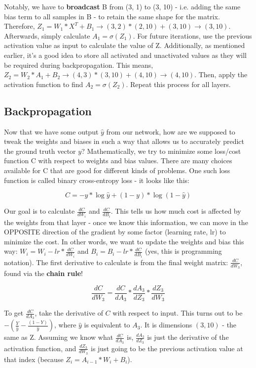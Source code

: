 \documentclass[12pt]{article}
\begin{document}
Notably, we have to \textbf{broadcast} B from (3, 1) to (3, 10) - i.e. adding the same bias term to all samples in B - to retain the same shape for the matrix. Therefore, $Z_1 = W_1 * X^T + B_1 \rightarrow (3, 2) * (2, 10) + (3, 10) \rightarrow (3, 10)$. Afterwards, simply calculate $A_1 = \sigma(Z_1)$. For future iterations, use the previous activation value as input to calculate the value of Z. Additionally, as mentioned earlier, it's a good idea to store all activated and unactivated values as they will be required during backpropagation. This means, $Z_2 = W_2 * A_1 + B_2 \rightarrow (4, 3) * (3, 10) + (4, 10) \rightarrow (4, 10)$. Then, apply the activation function to find $A_2 = \sigma(Z_2)$. Repeat this process for all layers. 

\subsection{Backpropagation}
Now that we have some output $\hat{y}$ from our network, how are we supposed to tweak the weights and biases in such a way that allows us to accurately predict the ground truth vector $y$? Mathematically, we try to minimize some loss/cost function C with respect to weights and bias values. There are many choices available for C that are good for different kinds of problems. One such loss function is called binary cross-entropy loss - it looks like this:

\[ C = -y * \log{\hat{y}} + (1-y) * \log{(1-\hat{y})} \]

Our goal is to calculate $\frac{dC}{dW_i}$ and $\frac{dC}{dB_i}$. This tells us how much cost is affected by the weights from that layer - once we know this information, we can move in the OPPOSITE direction of the gradient by some factor (learning rate, lr) to minimize the cost. In other words, we want to update the weights and bias this way: $W_i = W_i - lr * \frac{dC}{dW_i}$ and $B_i = B_i - lr * \frac{dC}{dB_i}$ (yes, this is programming notation). The first derivative to calculate is from the final weight matrix: $\frac{dC}{dW_3}$, found via the \textbf{chain rule}!

$$\frac{dC}{dW_3} = \frac{dC}{dA_3} * \frac{dA_3}{dZ_3} * \frac{dZ_3}{dW_3}$$ 

To get $\frac{dC}{dA_3}$, take the derivative of $C$ with respect to input. This turns out to be $-(\frac{Y}{\hat{y}} - \frac{(1-Y)}{\hat{y}})$, where $\hat{y}$ is equivalent to $A_3$. It is dimensions $(3, 10)$ - the same as Z. Assuming we know what $\frac{dC}{dA_3}$ is, $\frac{dA_3}{dZ_3}$ is just the derivative of the activation function, and $\frac{dZ_3}{dW_3}$ is just going to be the previous activation value at that index (because $Z_i = A_{i-1} * W_i + B_i$). 
\end{document}
